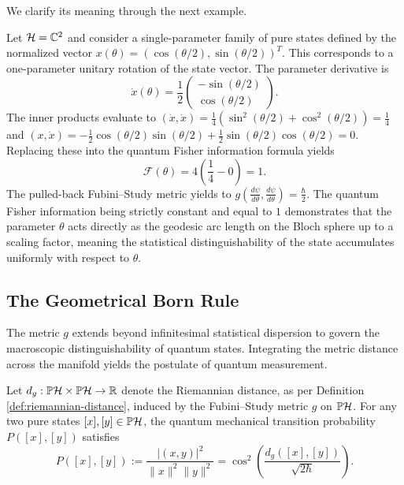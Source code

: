 \noindent We clarify its meaning through the next example.

\begin{example}
	Let $\H = \C^2$ and consider a single-parameter family of pure states defined by the normalized vector $x(\theta) = (\cos(\theta/2), \sin(\theta/2))^T$. This corresponds to a one-parameter unitary rotation of the state vector. The parameter derivative is
	\begin{equation}
		\dot{x}(\theta) = \frac{1}{2} \begin{pmatrix} -\sin(\theta/2) \\ \cos(\theta/2) \end{pmatrix}.
	\end{equation}
	The inner products evaluate to $(\dot{x}, \dot{x}) = \frac{1}{4}(\sin^2(\theta/2) + \cos^2(\theta/2)) = \frac{1}{4}$ and $(x, \dot{x}) = -\frac{1}{2}\cos(\theta/2)\sin(\theta/2) + \frac{1}{2}\sin(\theta/2)\cos(\theta/2) = 0$. Replacing these into the quantum Fisher information formula yields
	\begin{equation}
		\mathcal{F}(\theta) = 4 \left( \frac{1}{4} - 0 \right) = 1.
	\end{equation}
	The pulled-back Fubini--Study metric yields to $g\left(\frac{d\psi}{d\theta}, \frac{d\psi}{d\theta}\right) = \frac{\hbar}{2}$. The quantum Fisher information being strictly constant and equal to $1$ demonstrates that the parameter $\theta$ acts directly as the geodesic arc length on the Bloch sphere up to a scaling factor, meaning the statistical distinguishability of the state accumulates uniformly with respect to $\theta$.
\end{example}

\subsection*{The Geometrical Born Rule}

The metric $g$ extends beyond infinitesimal statistical dispersion to govern the macroscopic distinguishability of quantum states. Integrating the metric distance across the manifold yields the  postulate of quantum measurement.

\begin{theorem}
	\label{thm:born-rule-geodesic}
	Let $d_g : \PH \times \PH \to \R$ denote the Riemannian distance, as per Definition \ref{def:riemannian-distance}, induced by the Fubini--Study metric $g$ on $\PH$. For any two pure states $[x], [y] \in \PH$, the quantum mechanical transition probability $P([x], [y])$ satisfies
	\begin{equation}
		P([x], [y]) := \frac{|(x, y)|^2}{\|x\|^2\|y\|^2} = \cos^2\left(\frac{d_g([x], [y])}{\sqrt{2\hbar}}\right).
	\end{equation}
\end{theorem}

